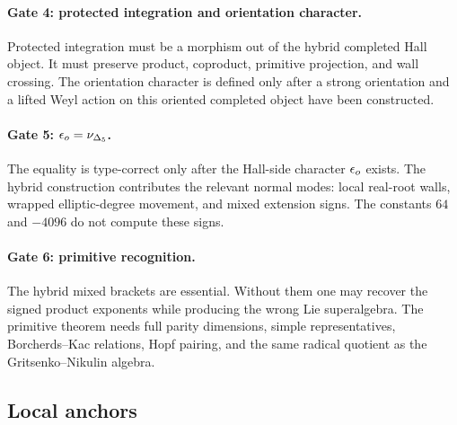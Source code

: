 \paragraph{Gate 4: protected integration and orientation character.}
Protected integration must be a morphism out of the hybrid completed
Hall object.  It must preserve product, coproduct, primitive projection,
and wall crossing.  The orientation character is defined only after a
strong orientation and a lifted Weyl action on this oriented completed
object have been constructed.

\paragraph{Gate 5: \(\epsilon_o=\nu_{\Delta_5}\).}
The equality is type-correct only after the Hall-side character
\(\epsilon_o\) exists.  The hybrid construction contributes the relevant
normal modes: local real-root walls, wrapped elliptic-degree movement,
and mixed extension signs.  The constants \(64\) and \(-4096\) do not
compute these signs.

\paragraph{Gate 6: primitive recognition.}
The hybrid mixed brackets are essential.  Without them one may recover
the signed product exponents while producing the wrong Lie
superalgebra.  The primitive theorem needs full parity dimensions,
simple representatives, Borcherds--Kac relations, Hopf pairing, and the
same radical quotient as the Gritsenko--Nikulin algebra.

\subsection{Local anchors}

